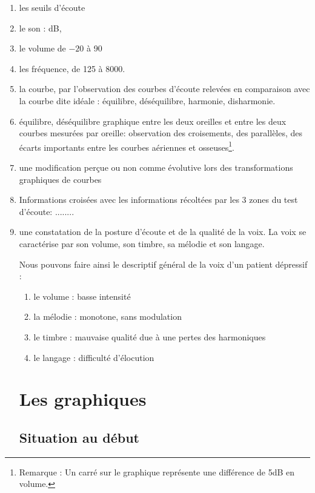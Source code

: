   \begin{enumerate}
 	\item les seuils d'écoute
 	\item le son : dB, 
 	\item le volume de $-20$ à 90 %
 	\item les fréquence, de 125 à 8000.   \label{chapitre 6.2t} %
 	\item la courbe, par l'observation des courbes d'écoute relevées
 	en comparaison avec la courbe dite idéale : équilibre,
 	déséquilibre, harmonie, disharmonie.  
 	\item équilibre, déséquilibre graphique entre les deux oreilles et entre les deux courbes mesurées par oreille: observation des croisements, des parallèles, des
 	écarts importants entre les courbes aériennes et osseuses\footnote{Remarque :
 		Un carré sur le graphique représente une différence de 5dB en
 		volume.}.
 	\item une modification perçue ou non comme évolutive lors des transformations graphiques de courbes
 	\item  Informations croisées avec les informations récoltées   par les 3 zones du test d'écoute: ........
 	\item une constatation de la posture d'écoute et de la qualité de
 	la voix. La voix se caractérise par son volume, son timbre, sa mélodie et son langage. 
 	
 	
 Nous pouvons faire ainsi le descriptif général de la voix d'un patient dépressif :
 	\begin{enumerate}
 		\item le volume : basse intensité
 		\item la mélodie : monotone, sans modulation
 		\item le timbre : mauvaise qualité due à une pertes des harmoniques
 		\item le langage : difficulté d'élocution
 	\end{enumerate}
 	
 		
 	
 	
 	
 	\section{Les graphiques}
 	
 	\lipsum[1]
 	
 	\subsection{Situation au début}
 	

\end{enumerate}
